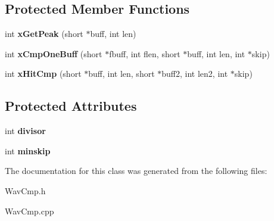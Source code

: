 \subsection*{Protected Member Functions}
\begin{DoxyCompactItemize}
\item 
\hypertarget{class_c_wav_cmp_a16621125fd1508721dbcee2f5a4068b3}{int {\bfseries x\-Get\-Peak} (short $\ast$buff, int len)}\label{class_c_wav_cmp_a16621125fd1508721dbcee2f5a4068b3}

\item 
\hypertarget{class_c_wav_cmp_a66b5b491488822a4e2da201c635150db}{int {\bfseries x\-Cmp\-One\-Buff} (short $\ast$fbuff, int flen, short $\ast$buff, int len, int $\ast$skip)}\label{class_c_wav_cmp_a66b5b491488822a4e2da201c635150db}

\item 
\hypertarget{class_c_wav_cmp_ad1db46b556e0d16de76fe422622cb1ed}{int {\bfseries x\-Hit\-Cmp} (short $\ast$buff, int len, short $\ast$buff2, int len2, int $\ast$skip)}\label{class_c_wav_cmp_ad1db46b556e0d16de76fe422622cb1ed}

\end{DoxyCompactItemize}
\subsection*{Protected Attributes}
\begin{DoxyCompactItemize}
\item 
\hypertarget{class_c_wav_cmp_a9c246f699c765aca33f06f8c7a098fc6}{int {\bfseries divisor}}\label{class_c_wav_cmp_a9c246f699c765aca33f06f8c7a098fc6}

\item 
\hypertarget{class_c_wav_cmp_a90dfcbc9210b1c0a447b38545c53252f}{int {\bfseries minskip}}\label{class_c_wav_cmp_a90dfcbc9210b1c0a447b38545c53252f}

\end{DoxyCompactItemize}


The documentation for this class was generated from the following files\-:\begin{DoxyCompactItemize}
\item 
Wav\-Cmp.\-h\item 
Wav\-Cmp.\-cpp\end{DoxyCompactItemize}
